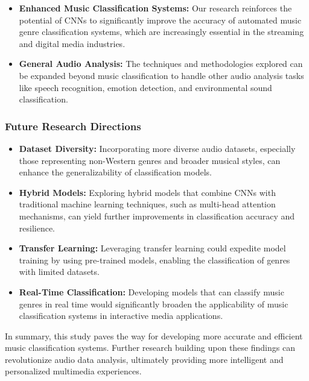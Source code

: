 \documentclass[lettersize,journal]{IEEEtran}
\begin{document}
\begin{itemize}
    \item \textbf{Enhanced Music Classification Systems:} Our research reinforces the potential of CNNs to significantly improve the accuracy of automated music genre classification systems, which are increasingly essential in the streaming and digital media industries.
    \item \textbf{General Audio Analysis:} The techniques and methodologies explored can be expanded beyond music classification to handle other audio analysis tasks like speech recognition, emotion detection, and environmental sound classification.
\end{itemize}

\subsubsection{Future Research Directions}

\begin{itemize}
    \item \textbf{Dataset Diversity:} Incorporating more diverse audio datasets, especially those representing non-Western genres and broader musical styles, can enhance the generalizability of classification models.
    \item \textbf{Hybrid Models:} Exploring hybrid models that combine CNNs with traditional machine learning techniques, such as multi-head attention mechanisms, can yield further improvements in classification accuracy and resilience.
    \item \textbf{Transfer Learning:} Leveraging transfer learning could expedite model training by using pre-trained models, enabling the classification of genres with limited datasets.
    \item \textbf{Real-Time Classification:} Developing models that can classify music genres in real time would significantly broaden the applicability of music classification systems in interactive media applications.
\end{itemize}

In summary, this study paves the way for developing more accurate and efficient music classification systems. Further research building upon these findings can revolutionize audio data analysis, ultimately providing more intelligent and personalized multimedia experiences.
\end{document}
